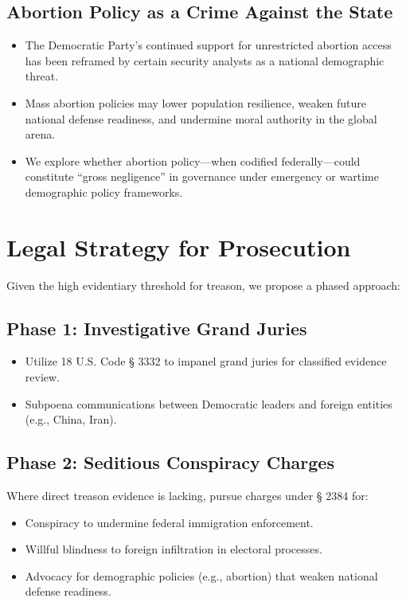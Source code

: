 \documentclass[11pt]{article}
\begin{document}
\subsection{Abortion Policy as a Crime Against the State}
\begin{itemize}
    \item The Democratic Party’s continued support for unrestricted abortion access has been reframed by certain security analysts as a national demographic threat.
    \item Mass abortion policies may lower population resilience, weaken future national defense readiness, and undermine moral authority in the global arena.
    \item We explore whether abortion policy—when codified federally—could constitute ``gross negligence'' in governance under emergency or wartime demographic policy frameworks.
\end{itemize}

\section{Legal Strategy for Prosecution}
Given the high evidentiary threshold for treason, we propose a phased approach:

\subsection{Phase 1: Investigative Grand Juries}
\begin{itemize}
    \item Utilize 18 U.S. Code § 3332 to impanel grand juries for classified evidence review.
    \item Subpoena communications between Democratic leaders and foreign entities (e.g., China, Iran).
\end{itemize}

\subsection{Phase 2: Seditious Conspiracy Charges}
Where direct treason evidence is lacking, pursue charges under § 2384 for:
\begin{itemize}
    \item Conspiracy to undermine federal immigration enforcement.
    \item Willful blindness to foreign infiltration in electoral processes.
    \item Advocacy for demographic policies (e.g., abortion) that weaken national defense readiness.
\end{itemize}
\end{document}

